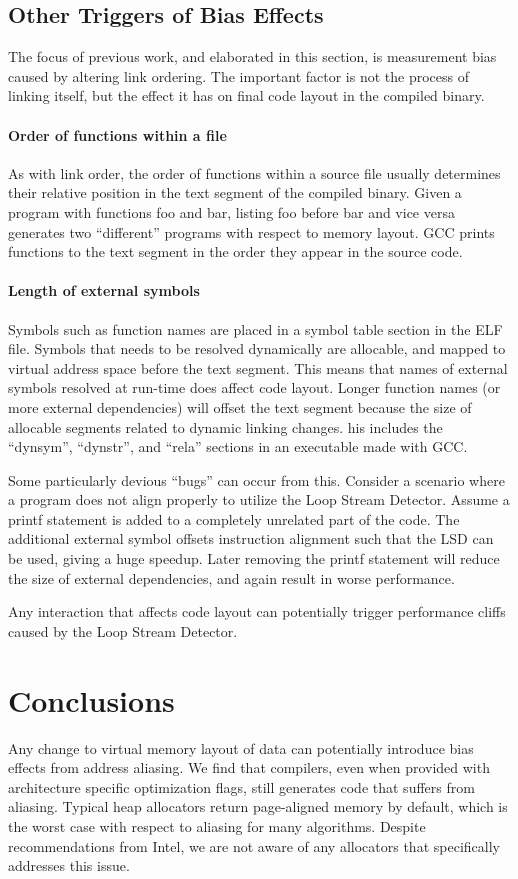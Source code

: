 \documentclass[a4paper,10pt,twocolumn,twoside]{article}
\begin{document}
\subsection{Other Triggers of Bias Effects}
The focus of previous work, and elaborated in this section, is measurement bias caused by altering link ordering.
The important factor is not the process of linking itself, but the effect it has on final code layout in the compiled binary. 

\paragraph{Order of functions within a file}
As with link order, the order of functions within a source file usually determines their relative position in the text segment of the compiled binary. 
Given a program with functions foo and bar, listing foo before bar and vice versa generates two “different” programs with respect to memory layout. 
GCC prints functions to the text segment in the order they appear in the source code.

\paragraph{Length of external symbols}
Symbols such as function names are placed in a symbol table section in the ELF file.
Symbols that needs to be resolved dynamically are allocable, and mapped to virtual address space before the text segment. 
This means that names of external symbols resolved at run-time does affect code layout. 
Longer function names (or more external dependencies) will offset the text segment because the size of allocable segments related to dynamic linking changes. 
his includes the “dynsym”, “dynstr”, and “rela” sections in an executable made with GCC.

Some particularly devious “bugs” can occur from this. 
Consider a scenario where a program does not align properly to utilize the Loop Stream Detector. 
Assume a printf statement is added to a completely unrelated part of the code. 
The additional external symbol offsets instruction alignment such that the LSD can be used, giving a huge speedup.
Later removing the printf statement will reduce the size of external dependencies, and again result in worse performance. 

Any interaction that affects code layout can potentially trigger performance cliffs caused by the Loop Stream Detector.


\section{Conclusions}
Any change to virtual memory layout of data can potentially introduce bias effects from address aliasing. 
We find that compilers, even when provided with architecture specific optimization flags, still generates code that suffers from aliasing. 
Typical heap allocators return page-aligned memory by default, which is the worst case with respect to aliasing for many algorithms.
Despite recommendations from Intel, we are not aware of any allocators that specifically addresses this issue.
\end{document}
